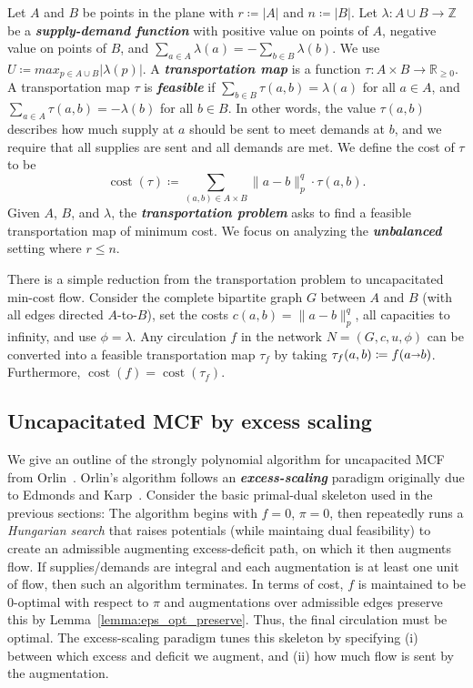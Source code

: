 \documentclass[a4paper,UKenglish]{socg-lipics-v2018}
\def\reals{\mathbb{R}}
\def\ints{\mathbb{Z}}
\def\abs#1{\mathopen| #1 \mathclose|}		%
\def\norm#1{\mathopen\| #1 \mathclose\|}	%
\def\tsupply{\lambda}
\def\fsupply{\phi}
\def\arcto{\mathord\shortrightarrow}
\def\arc#1#2{#1\arcto#2}
\def\cost{\operatorname{cost}}
\theoremstyle{plain}
\numberwithin{figure}{section}
\def\EMPH#1{\textbf{\emph{\boldmath #1}}}
\begin{document}
Let $A$ and $B$ be points in the plane with $r \coloneqq \abs{A}$ and
$n \coloneqq \abs{B}$.
Let $\tsupply:A \cup B \to \ints$ be a \EMPH{supply-demand function} with
positive value on points of $A$, negative value on points of $B$, and
$\sum_{a \in A} \tsupply(a) = - \sum_{b \in B} \tsupply(b)$.
We use $U \coloneqq max_{p \in A \cup B} \abs{\tsupply(p)}$.
A \EMPH{transportation map} is a function
$\tau: A \times B \to \reals_{\geq 0}$.
A transportation map $\tau$ is \EMPH{feasible} if
$\sum_{b \in B} \tau(a, b) = \tsupply(a)$ for all $a \in A$, and
$\sum_{a \in A} \tau(a, b) = -\tsupply(b)$ for all $b \in B$.
In other words, the value $\tau(a, b)$ describes how much supply at $a$ should
be sent to meet demands at $b$, and we require that all supplies are sent
and all demands are met.
We define the cost of $\tau$ to be
\[
	\cost(\tau) \coloneqq \sum_{(a, b) \in A \times B} \norm{a-b}_p^q \cdot \tau(a, b).
\]
Given $A$, $B$, and $\tsupply$, the \EMPH{transportation problem} asks to find
a feasible transportation map of minimum cost.
We focus on analyzing the \EMPH{unbalanced} setting where $r \leq n$.

There is a simple reduction from the transportation problem to uncapacitated
min-cost flow.
Consider the complete bipartite graph $G$ between $A$ and $B$ (with all edges
directed $A$-to-$B$), set the costs $c(a, b) = \norm{a-b}_p^q$, all capacities to
infinity, and use $\fsupply = \tsupply$.
Any circulation $f$ in the network $N = (G, c, u, \fsupply)$ can be converted
into a feasible transportation map $\tau_f$ by taking
$\tau_f(a, b) \coloneqq f(\arc ab)$.
Furthermore, $\cost(f) = \cost(\tau_f)$.

\subsection{Uncapacitated MCF by excess scaling}

We give an outline of the strongly polynomial algorithm for uncapacited MCF
from Orlin~\cite{O93}.
Orlin's algorithm follows an \EMPH{excess-scaling} paradigm originally due to
Edmonds and Karp~\cite{EK72}.
Consider the basic primal-dual skeleton used in the previous sections:
The algorithm begins with $f = 0$, $\pi = 0$, then repeatedly runs a
\emph{Hungarian search} that raises potentials (while maintaing dual
feasibility) to create an admissible augmenting excess-deficit path, on which
it then augments flow.
If supplies/demands are integral and each augmentation is at least one unit of
flow, then such an algorithm terminates.
In terms of cost, $f$ is maintained to be $0$-optimal with respect to $\pi$
and augmentations over admissible edges preserve this by
Lemma~\ref{lemma:eps_opt_preserve}.
Thus, the final circulation must be optimal.
The excess-scaling paradigm tunes this skeleton by specifying (i) between which
excess and deficit we augment, and (ii) how much flow is sent by the
augmentation.
\end{document}
